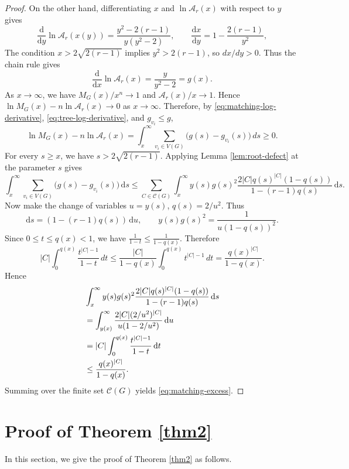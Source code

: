 \documentclass[11pt, a4paper]{article}
\theoremstyle{plain}
\begin{document}
\begin{proof}
On the other hand, differentiating $x$ and $\ln\mathcal{A}_r(x)$ with respect to $y$ gives
\[
 \frac{\mathrm{d}}{\mathrm{d}y}\ln\mathcal{A}_r(x(y))
 =\frac{y^2-2(r-1)}{y(y^2-2)},
 \qquad
 \frac{\mathrm{d} x}{\mathrm{d} y}=1-\frac{2(r-1)}{y^2},
\]
The condition $x>2\sqrt{2(r-1)}$ implies $y^2>2(r-1)$, so $dx/dy>0$.
Thus the chain rule gives
\begin{equation}\label{eq:tree-log-derivative}
 \frac{\mathrm{d}}{\mathrm{d}x}\ln\mathcal{A}_r(x)=\frac{y}{y^2-2}=g(x).
\end{equation}
As $x\to\infty$, we have $M_G(x)/x^n\to1$ and $\mathcal{A}_r(x)/x\to1$.
Hence $\ln M_G(x)-n\ln\mathcal{A}_r(x)\to0$ as $x\to\infty$.
Therefore, by \eqref{eq:matching-log-derivative}, \eqref{eq:tree-log-derivative}, and $g_{v_i}\leq g$,
\[
 \ln M_G(x)-n\ln\mathcal{A}_r(x)
 =\int_x^\infty\sum_{v_i\in V(G)}\bigl(g(s)-g_{v_i}(s)\bigr)\, ds\geq0.
\]
For every $s\ge x$, we have $s>2\sqrt{2(r-1)}$.
Applying Lemma \ref{lem:root-defect} at the parameter $s$ gives
\[
\int_x^\infty\sum_{v_i\in V(G)}\bigl(g(s)-g_{v_i}(s)\bigr)\,\mathrm{d} s \leq
\sum_{C\in\mathcal{C}(G)} \int_x^\infty y(s)g(s)^2
 \frac{2|C|q(s)^{|C|}(1-q(s))}{1-(r-1)q(s)}\, \mathrm{d}s.
\]
Now make the change of variables $u=y(s)$, $q(s)=2/u^2$.
Thus
\[
 \mathrm{d} s=(1-(r-1)q(s))\,\mathrm{d} u,
 \qquad y(s)g(s)^2=\frac1{u(1-q(s))^2}.
\]
Since $0\leq t\leq q(x)<1$, we have
$\frac1{1-t}\le\frac1{1-q(x)}$.
Therefore
\[
|C|
\int_0^{q(x)}
\frac{t^{|C|-1}}{1-t}\, dt
\le
\frac{|C|}{1-q(x)}
\int_0^{q(x)}
t^{|C|-1}\, dt
=
\frac{q(x)^{|C|}}{1-q(x)}.
\]
Hence
\begin{align*}
&\int_x^\infty y(s)g(s)^2
 \frac{2|C|q(s)^{|C|}(1-q(s))}{1-(r-1)q(s)}\, \mathrm{d}s \notag \\
&=\int_{y(x)}^\infty
       \frac{2|C|(2/u^2)^{|C|}}{u(1-2/u^2)}\,\mathrm{d} u \notag \\
&=|C|\int_0^{q(x)}\frac{t^{|C|-1}}{1-t}\,\mathrm{d} t \notag \\
&\leq\frac{q(x)^{|C|}}{1-q(x)}. 
\end{align*}
Summing over the finite set $\mathcal{C}(G)$ yields \eqref{eq:matching-excess}.
\end{proof}

\section{Proof of Theorem \ref{thm2}}
In this section, we give the proof of Theorem \ref{thm2} as follows.
\end{document}
